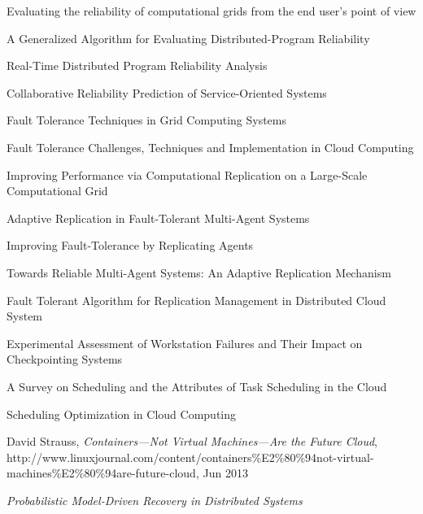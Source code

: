 \documentclass{cslthse-msc}
\begin{document}
\begin{thebibliography}{50}
Evaluating the reliability of computational grids from the end user’s point of view

A Generalized Algorithm for Evaluating Distributed-Program Reliability

Real-Time Distributed Program Reliability Analysis

Collaborative Reliability Prediction of Service-Oriented Systems

Fault Tolerance Techniques in Grid Computing Systems

Fault Tolerance Challenges, Techniques and Implementation in Cloud Computing

Improving Performance via Computational Replication on a Large-Scale Computational Grid

Adaptive Replication in Fault-Tolerant Multi-Agent Systems

Improving Fault-Tolerance by Replicating Agents

Towards Reliable Multi-Agent Systems: An Adaptive Replication Mechanism

Fault Tolerant Algorithm for Replication Management in Distributed Cloud System

Experimental Assessment of Workstation Failures and Their Impact on Checkpointing Systems

A Survey on Scheduling and the Attributes of Task Scheduling in the Cloud

Scheduling Optimization in Cloud Computing

	David Strauss,
	\emph{Containers—Not Virtual Machines—Are the Future Cloud},
	http://www.linuxjournal.com/content/containers\%E2\%80\%94not-virtual-machines\%E2\%80\%94are-future-cloud,
	Jun 2013
	
	\emph{Probabilistic Model-Driven Recovery in Distributed Systems}


\end{thebibliography}
\end{document}
